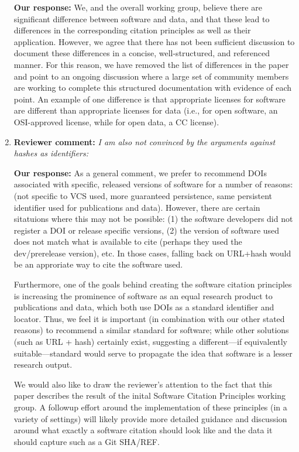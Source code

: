 \documentclass{article}
\begin{document}
\begin{enumerate}
\begin{itemize}
\end{itemize}

\textbf{Our response:} We, and the overall working group, believe there are significant difference
between software and data, and that these lead to differences in the corresponding citation principles
as well as their application.
However, we agree that there has not been sufficient discussion to document these
differences in a concise, well-structured, and referenced manner.
For this reason, we have removed the list of differences in the paper and point
to an ongoing discussion where a large set of community members are working
to complete this structured documentation with evidence of each point.  An example
of one difference is that appropriate licenses for software are different than appropriate
licenses for data (i.e., for open software, an OSI-approved license, while for open data, a CC license).


\item \textbf{Reviewer comment:}
\emph{I am also not convinced by the arguments against hashes as identifiers:}

\textbf{Our response:}
As a general comment, we prefer to recommend DOIs associated with specific,
released versions of software for a number of reasons: (not specific to VCS used,
more guaranteed persistence, same persistent identifier used for publications and data).
However, there are certain sitatuions where this may not be possible:
(1) the software developers did not register a DOI or release specific
versions, (2) the version of software used does not match what is available
to cite (perhaps they used the dev/prerelease version), etc. In those cases,
falling back on URL+hash would be an approriate way to cite the software used.

Furthermore, one of the goals behind creating the software citation principles
is increasing the prominence of software as an equal research product to
publications and data, which both use DOIs as a standard identifier and locator.
Thus, we feel it is important (in combination with our other stated reasons) to
recommend a similar standard for software; while other solutions (such as URL +
hash) certainly exist, suggesting a different---if equivalently suitable---standard
would serve to propagate the idea that software is a lesser research output.

We would also like to draw the reviewer's attention to the fact that this paper
describes the result of the inital Software Citation Principles working group. A
followup effort around the implementation of these principles (in a variety of
settings) will likely provide more detailed guidance and discussion around what
exactly a software citation should look like and the data it should capture such
as a Git SHA/REF.


\end{enumerate}
\end{document}
